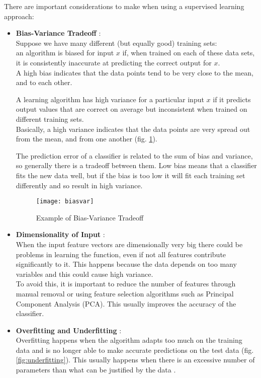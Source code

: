 There are important considerations to make when using a supervised learning approach:
\begin{itemize}
	\item \textbf{Bias-Variance Tradeoff} \cite{biasvar}: \\	
	Suppose we have many different (but equally good) training sets: \\
	an algorithm is biased for input $x$ if, when trained on each of these data sets, it is consistently inaccurate at predicting the correct output for $x$. \\
	A high bias indicates that the data points tend to be very close to the mean, and to each other.
	
	A learning algorithm has high variance for a particular input $x$ if it predicts output values that are correct on average but inconsistent when trained on different training sets. \\
	Basically, a high variance indicates that the data points are very spread out from the mean, and from one another (fig. \ref{fig:biasvar}).
	
	The prediction error of a classifier is related to the sum of bias and variance, so generally there is a tradeoff between them. Low bias means that a classifier fits the new data well, but if the bias is too low it will fit each training set differently and so result in high variance.
	
	\begin{figure}[H]
		\centering
		\texttt{[image: biasvar]}
		\caption{Example of Bias-Variance Tradeoff \cite{biasvarTradeoff}}
		\label{fig:biasvar}
	\end{figure}	

	\item \textbf{Dimensionality of Input} \cite{wiki:dim_red}:\\ 
	When the input feature vectors are dimensionally very big there could be problems in learning the function, even if not all features contribute significantly to it. This happens because the data depends on too many variables and this could cause high variance. \\
	To avoid this, it is important to reduce the number of features through manual removal or using feature selection algorithms such as Principal Component Analysis (PCA). This usually improves the accuracy of the classifier.
	
	\item \textbf{Overfitting and Underfitting} \cite{overfit}: \\	
	Overfitting happens when the algorithm adapts too much on the training data and is no longer able to make accurate predictions on the test data (fig. \ref{fig:underfitting}). This usually happens when there is an excessive number of parameters than what can be justified by the data \cite{camb_over}.
	

\end{itemize}
